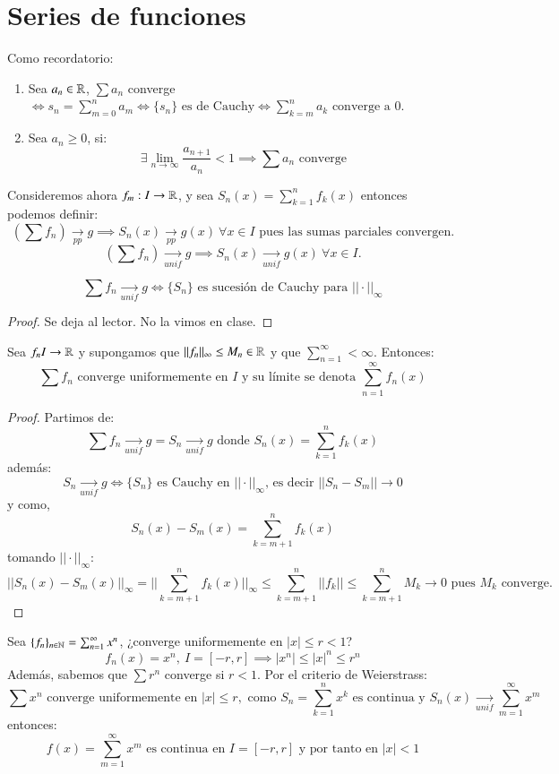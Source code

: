 \section{Series de funciones}
Como recordatorio:
\begin{enumerate}
    \item Sea $a_n \in \mathbb{R}$, $\sum a_n$ converge $\iff s_n = \sum_{m=0}^n a_m \iff \{s_n\} \text{ es de Cauchy} \iff \sum_{k=m}^n a_k \text{ converge a } 0$.
    \item Sea $a_n \geq 0$, si:
    $$
        \exists \lim_{n \to \infty} \frac{a_{n+1}}{a_n} < 1 \implies \sum a_n \text{ converge}
    $$
\end{enumerate}
Consideremos ahora $f_m : I \to \mathbb{R}$, y sea $S_n(x) = \sum_{k=1}^n f_k(x)$  entonces podemos definir:
$$
    \left(\sum f_n\right) \xrightarrow[pp]{} g \implies  S_n(x)\xrightarrow[pp]{} g(x)\ \forall x \in I \text{ pues las sumas parciales convergen.}
$$
$$
    \left(\sum f_n\right) \xrightarrow[unif]{} g \implies S_n(x) \xrightarrow[unif]{} g(x)\ \forall x \in I.
$$
\begin{pro}
    $$
        \sum f_n \xrightarrow[unif]{} g \iff \{S_n\} \text{ es sucesión de Cauchy para $||\cdot||_\infty$}
    $$
\end{pro}
\begin{proof}
    Se deja al lector. No la vimos en clase.
\end{proof}
\begin{pro}
    Sea $f_n I \to \mathbb{R}$ y supongamos que $||f_n||_\infty \leq M_n \in \mathbb{R}$  y que $\sum_{n=1}^\infty < \infty$. Entonces:
    $$
        \sum f_n \text{ converge uniformemente en $I$ y su límite se denota } \sum_{n=1}^\infty f_n(x)
    $$
\end{pro}
\begin{proof}
    Partimos de:
    $$
        \sum f_n \xrightarrow[unif]{} g = S_n \xrightarrow[unif]{} g \text{ donde } S_n(x) = \sum_{k=1}^n f_k(x)
    $$
    además:
    $$
        S_n \xrightarrow[unif]{} g \iff \{S_n\} \text{ es Cauchy en $|| \cdot ||_\infty$, es decir } ||S_n - S_m || \to 0
    $$
    y como,
    $$
        S_n(x) - S_m(x) = \sum_{k=m+1}^n f_k(x)
    $$
    tomando $||\cdot||_\infty$:
    $$
        ||S_n(x) - S_m(x)||_\infty = ||\sum_{k=m+1}^n f_k(x)||_\infty \leq \sum_{k=m+1}^{n} ||f_k|| \leq \sum_{k=m+1}^{n} M_k \to 0 \text{ pues $M_k$ converge.}
    $$
\end{proof}
\begin{eg}
    Sea $\{f_n\}_{n\in\mathbb{N}} = \sum_{n=1}^\infty x^n$, ¿converge uniformemente en $|x| \leq r < 1$?\\
    $$
        f_n(x) = x^n,\ I = [-r, r] \implies |x^n| \leq |x|^n \leq r^n
    $$
    Además, sabemos que $\sum r^n$ converge si $r<1$.
    Por el criterio de Weierstrass:
    $$
        \sum x^n \text{ converge uniformemente en } |x| \leq r, \text{ como } S_n=\sum_{k=1}^n x^k \text{ es continua y } S_n(x) \xrightarrow[unif]{} \sum_{m=1}^\infty x^m
    $$
    entonces:
    $$
        f(x) = \sum_{m=1}^{\infty} x^m \text{ es continua en } I = [-r, r] \text{ y por tanto en } |x| < 1
    $$
\end{eg}

